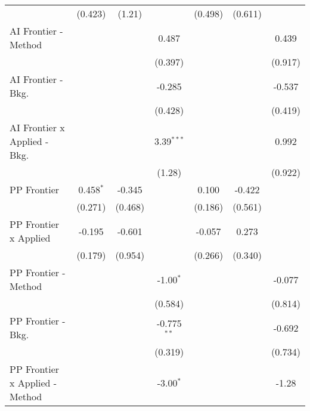 \begin{tabular}{lcccccc}
                                  & (0.423)       & (1.21)        &               & (0.498)       & (0.611)       &   \\   
   AI Frontier - Method           &               &               & 0.487         &               &               & 0.439\\   
                                  &               &               & (0.397)       &               &               & (0.917)\\   
   AI Frontier - Bkg.             &               &               & -0.285        &               &               & -0.537\\   
                                  &               &               & (0.428)       &               &               & (0.419)\\   
   AI Frontier x Applied - Bkg.   &               &               & 3.39$^{***}$  &               &               & 0.992\\   
                                  &               &               & (1.28)        &               &               & (0.922)\\   
   PP Frontier                    & 0.458$^{*}$   & -0.345        &               & 0.100         & -0.422        &   \\   
                                  & (0.271)       & (0.468)       &               & (0.186)       & (0.561)       &   \\   
   PP Frontier x Applied          & -0.195        & -0.601        &               & -0.057        & 0.273         &   \\   
                                  & (0.179)       & (0.954)       &               & (0.266)       & (0.340)       &   \\   
   PP Frontier - Method           &               &               & -1.00$^{*}$   &               &               & -0.077\\   
                                  &               &               & (0.584)       &               &               & (0.814)\\   
   PP Frontier - Bkg.             &               &               & -0.775$^{**}$ &               &               & -0.692\\   
                                  &               &               & (0.319)       &               &               & (0.734)\\   
   PP Frontier x Applied - Method &               &               & -3.00$^{*}$   &               &               & -1.28\\   

\end{tabular}
